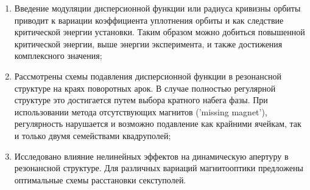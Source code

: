 \begin{enumerate}

\item Введение модуляции дисперсионной функции или радиуса кривизны орбиты приводит к вариации коэффициента уплотнения орбиты и как следствие критической энергии установки. Таким образом можно добиться повышенной критической энергии, выше энергии эксперимента, и также достижения комплексного значения;

\item Рассмотрены схемы подавления дисперсионной функции в резонансной структуре на краях поворотных арок. В случае полностью регулярной структуре это достигается путем выбора кратного набега фазы. При использовании метода отсутствующих магнитов ('missing magnet'), регулярность нарушается и возможно подавление как крайними ячейкам, так и только двумя семействами квадруполей;

\item Исследовано влияние нелинейных эффектов на динамическую апертуру в резонансной структуре. Для различных вариаций магнитооптики предложены оптимальные схемы расстановки секступолей.

\end{enumerate}

\FloatBarrier